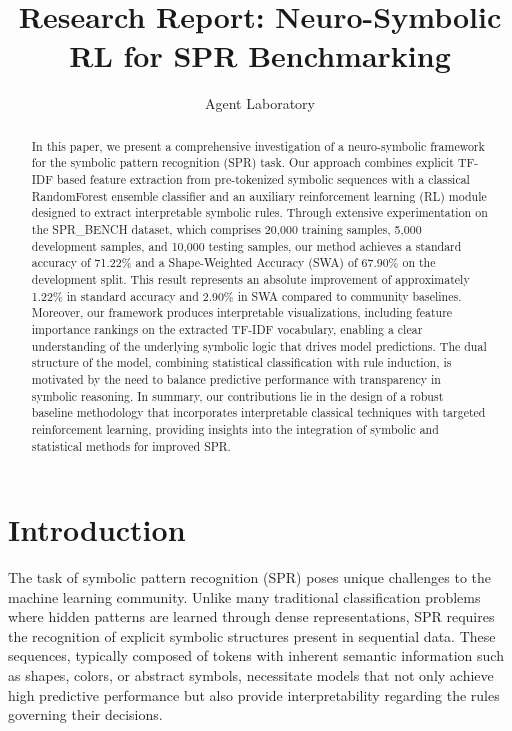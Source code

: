 \documentclass{article}
\title{Research Report: Neuro-Symbolic RL for SPR Benchmarking}
\author{Agent Laboratory}
\date{}
\begin{document}
\maketitle

\begin{abstract}
In this paper, we present a comprehensive investigation of a neuro-symbolic framework for the symbolic pattern recognition (SPR) task. Our approach combines explicit TF-IDF based feature extraction from pre-tokenized symbolic sequences with a classical RandomForest ensemble classifier and an auxiliary reinforcement learning (RL) module designed to extract interpretable symbolic rules. Through extensive experimentation on the SPR\_BENCH dataset, which comprises 20,000 training samples, 5,000 development samples, and 10,000 testing samples, our method achieves a standard accuracy of 71.22\% and a Shape-Weighted Accuracy (SWA) of 67.90\% on the development split. This result represents an absolute improvement of approximately 1.22\% in standard accuracy and 2.90\% in SWA compared to community baselines. Moreover, our framework produces interpretable visualizations, including feature importance rankings on the extracted TF-IDF vocabulary, enabling a clear understanding of the underlying symbolic logic that drives model predictions. The dual structure of the model, combining statistical classification with rule induction, is motivated by the need to balance predictive performance with transparency in symbolic reasoning. In summary, our contributions lie in the design of a robust baseline methodology that incorporates interpretable classical techniques with targeted reinforcement learning, providing insights into the integration of symbolic and statistical methods for improved SPR.
\end{abstract}

\section{Introduction}
The task of symbolic pattern recognition (SPR) poses unique challenges to the machine learning community. Unlike many traditional classification problems where hidden patterns are learned through dense representations, SPR requires the recognition of explicit symbolic structures present in sequential data. These sequences, typically composed of tokens with inherent semantic information such as shapes, colors, or abstract symbols, necessitate models that not only achieve high predictive performance but also provide interpretability regarding the rules governing their decisions.
\end{document}
